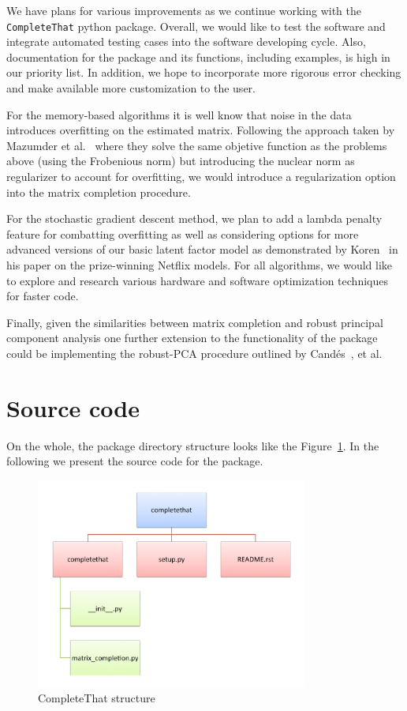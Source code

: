 \documentclass[12pt]{article}
\begin{document}
We have plans for various improvements as we continue working with the \texttt{CompleteThat} python package. Overall, we would like to test the software and integrate automated testing cases into the software developing cycle. Also, documentation for the package and its functions, including examples, is high in our priority list. In addition, we hope to incorporate more rigorous error checking and make   available more customization to the user. 

For the memory-based algorithms it is well know that noise in the data introduces overfitting on the estimated matrix. Following the approach taken by Mazumder et al.~\cite{mazumder:2010}  where they solve the same objetive function as the problems above (using the Frobenious norm) but introducing the nuclear norm as regularizer to account for overfitting, we would introduce a regularization option into the matrix completion procedure. 

For the stochastic gradient descent method, we plan to add a lambda penalty feature for combatting overfitting as well as considering options for more advanced versions of our basic latent factor model as demonstrated by Koren~\cite{koren:2008} in his paper on the prize-winning Netflix models. 
For all algorithms, we would like to explore and research various hardware and software optimization techniques for faster code. 

Finally, given the similarities between matrix completion and robust principal component analysis one further extension to the functionality of the package could be implementing the robust-PCA procedure outlined by Cand\'es~\cite{candes:2011}, et al.

\newpage



\newpage
\section{Source code}
On the whole, the package directory structure looks like the Figure~\ref{fig:code_scheme}. In the following we present the source code for the package.
\begin{figure}[h!]
  \centering
    \includegraphics[width=0.8\textwidth]{./figures/code_scheme.pdf}
    \caption{CompleteThat structure}
    \label{fig:code_scheme}
\end{figure}
\end{document}
